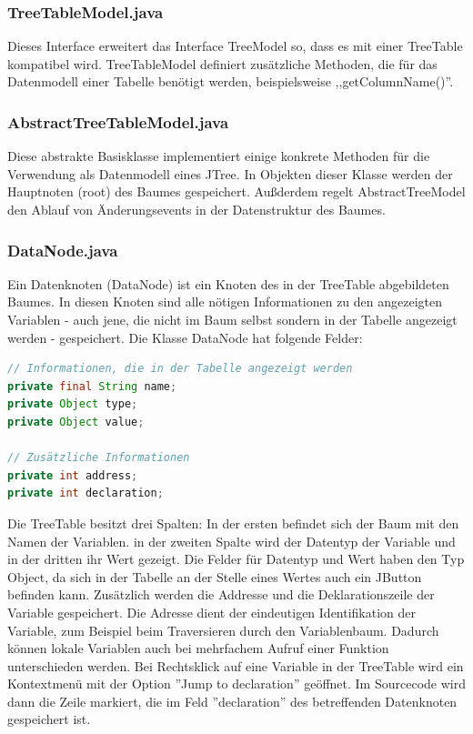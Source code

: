 \subsubsection*{TreeTableModel.java}
Dieses Interface erweitert das Interface TreeModel so, dass es mit einer TreeTable kompatibel wird. TreeTableModel definiert zusätzliche Methoden, die für das Datenmodell einer Tabelle benötigt werden, beispielsweise ,,getColumnName()''.

\subsubsection*{AbstractTreeTableModel.java}
Diese abstrakte Basisklasse implementiert einige konkrete Methoden für die Verwendung als Datenmodell eines JTree. In Objekten dieser Klasse werden der Hauptnoten (root) des Baumes gespeichert. Außderdem regelt AbstractTreeModel den Ablauf von Änderungsevents in der Datenstruktur des Baumes.

\subsubsection*{DataNode.java}
Ein Datenknoten (DataNode) ist ein Knoten des in der TreeTable abgebildeten Baumes. In diesen Knoten sind alle nötigen Informationen zu den angezeigten Variablen - auch jene, die nicht im Baum selbst sondern in der Tabelle angezeigt werden - gespeichert.
\newline
Die Klasse DataNode hat folgende Felder:
\begin{lstlisting}[language=JAVA]
// Informationen, die in der Tabelle angezeigt werden
private final String name;
private Object type;
private Object value;

// Zusätzliche Informationen
private int address;
private int declaration;
\end{lstlisting}
Die TreeTable besitzt drei Spalten: In der ersten befindet sich der Baum mit den Namen der Variablen. in der zweiten Spalte wird der Datentyp der Variable und in der dritten ihr Wert gezeigt. Die Felder für Datentyp und Wert haben den Typ Object, da sich in der Tabelle an der Stelle eines Wertes auch ein JButton befinden kann.
\newline
Zusätzlich werden die Addresse und die Deklarationszeile der Variable gespeichert. Die Adresse dient der eindeutigen Identifikation der Variable, zum Beispiel beim Traversieren durch den Variablenbaum. Dadurch können lokale Variablen auch bei mehrfachem Aufruf einer Funktion unterschieden werden.
\newline
Bei Rechtsklick auf eine Variable in der TreeTable wird ein Kontextmenü mit der Option ''Jump to declaration'' geöffnet. Im Sourcecode wird dann die Zeile markiert, die im Feld ''declaration'' des betreffenden Datenknoten gespeichert ist.


